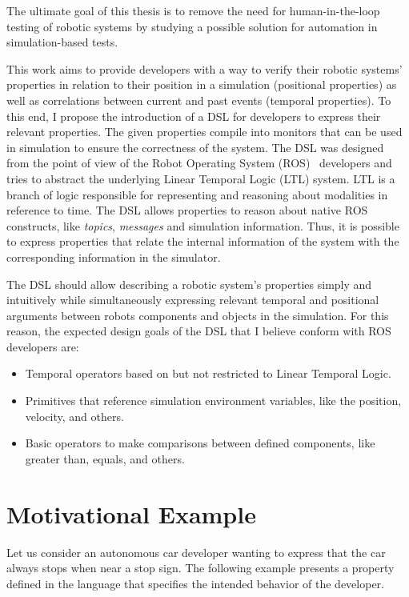 The ultimate goal of this thesis is to remove the need for human-in-the-loop testing of robotic systems by studying a possible solution for automation in simulation-based tests.

This work aims to provide developers with a way to verify their robotic systems' properties in relation to their position in a simulation (positional properties) as well as correlations between current and past events (temporal properties). To this end, I propose the introduction of a DSL for developers to express their relevant properties. The given properties compile into monitors that can be used in simulation to ensure the correctness of the system. The DSL was designed from the point of view of the Robot Operating System (ROS)~\cite{quigley2009ros} developers and tries to abstract the underlying Linear Temporal Logic (LTL) system. LTL is a branch of logic responsible for representing and reasoning about modalities in reference to time. The DSL allows properties to reason about native ROS constructs, like \textit{topics}, \textit{messages} and simulation information. Thus, it is possible to express properties that relate the internal information of the system with the corresponding information in the simulator.

The DSL should allow describing a robotic system's properties simply and intuitively while simultaneously expressing relevant temporal and positional arguments between robots components and objects in the simulation. For this reason, the expected design goals of the DSL that I believe conform with ROS developers are:

\begin{itemize}
\item Temporal operators based on but not restricted to Linear Temporal Logic.
\item Primitives that reference simulation environment variables, like the position, velocity, and others.
\item Basic operators to make comparisons between defined components, like greater than, equals, and others.
\end{itemize}


\section{Motivational Example}
\label{sec:motivationalexample}

Let us consider an autonomous car developer wanting to express that the car always stops when near a stop sign. The following example presents a property defined in the language that specifies the intended behavior of the developer.

